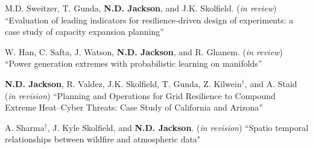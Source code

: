 \documentclass{article}[12pt]
\begin{document}
	\begin{etaremune}[]
		
		
		\item M.D. Sweitzer, T. Gunda, \textbf{N.D. Jackson}, and J.K. Skolfield. (\textit{in review}) ``Evaluation of leading indicators for resilience-driven design of experiments: a case study of capacity expansion planning'' %
		
		\item W. Han, C. Safta, J. Watson, \textbf{N.D. Jackson}, and R. Ghanem.  (\textit{in review}) ``Power generation extremes with probabilistic learning on manifolds'' %
		
		
		\item \textbf{N.D. Jackson}, R. Valdez, J.K. Skolfield, T. Gunda, Z. Kilwein$^{\dagger}$, and A. Staid (\textit{in revision}) ``Planning and Operations for Grid Resilience to Compound Extreme Heat–Cyber Threats: Case Study of California and Arizona''
		
		\item A. Sharma$^{\dagger}$, J. Kyle Skolfield, and \textbf{N.D. Jackson}. (\textit{in revision}) ``Spatio temporal relationships between wildfire and atmospheric data"
		
		
		
		
		
		
	\end{etaremune}
	
\end{document}
